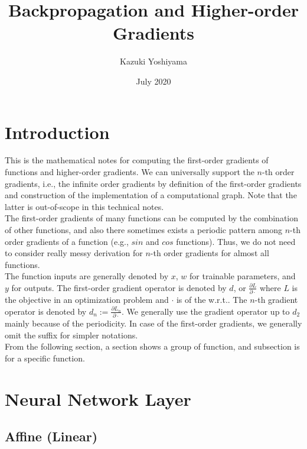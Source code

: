 \documentclass{article}
\title{Backpropagation and Higher-order Gradients}
\author{Kazuki Yoshiyama}
\date{July 2020}
\begin{document}
\maketitle


\section{Introduction}
\label{sec:intro}

This is the mathematical notes for computing the first-order gradients of functions and higher-order gradients. We can universally support the $n$-th order gradients, i.e., the infinite order gradients by definition of the first-order gradients and construction of the implementation of a computational graph. Note that the latter is out-of-scope in this technical notes. \\

The first-order gradients of many functions can be computed by the combination of other functions, and also there sometimes exists a periodic pattern among $n$-th order gradients of a function (e.g., $sin$ and $cos$ functions). Thus, we do not need to consider really messy derivation for $n$-th order gradients for almost all functions.\\

The function inputs are generally denoted by $x$, $w$ for trainable parameters, and $y$ for outputs. The first-order gradient operator is denoted by $d$, or $\frac{\partial L}{\partial \cdot}$ where $L$ is the objective in an optimization problem and $\cdot$ is of the w.r.t.. The $n$-th gradient operator is denoted by $d_n := \frac{\partial L_n}{\partial \cdot}$. We generally use the gradient operator up to $d_2$ mainly because of the periodicity. In case of the first-order gradients, we generally omit the suffix for simpler notations.\\


From the following section, a section shows a group of function, and subsection is for a specific function.

\section{Neural Network Layer}
\label{sec:Neural Network Layer}

\subsection{Affine (Linear)}
\end{document}
